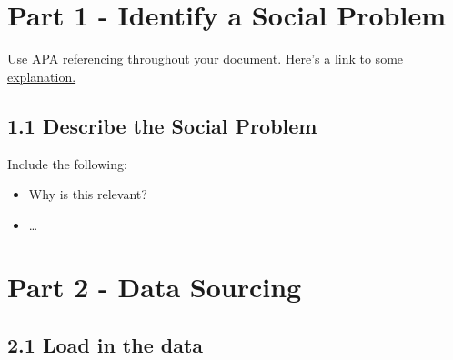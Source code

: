 \documentclass[
]{article}
\begin{document}
\section{Part 1 - Identify a Social
Problem}\label{part-1---identify-a-social-problem}

Use APA referencing throughout your document.
\href{https://www.mendeley.com/guides/apa-citation-guide/}{Here's a link
to some explanation.}

\subsection{1.1 Describe the Social
Problem}\label{describe-the-social-problem}

Include the following:

\begin{itemize}
\item
  Why is this relevant?
\item
  \ldots{}
\end{itemize}

\section{Part 2 - Data Sourcing}\label{part-2---data-sourcing}

\subsection{2.1 Load in the data}\label{load-in-the-data}
\end{document}
